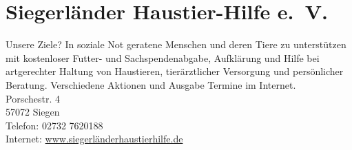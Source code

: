 \section{Siegerländer Haustier-Hilfe e.~V.}
Unsere Ziele? In soziale Not geratene Menschen und deren Tiere zu unterstützen mit kostenloser Futter- und Sachspendenabgabe, Aufklärung und Hilfe bei artgerechter Haltung von Haustieren, tierärztlicher Versorgung und persönlicher Beratung. Verschiedene Aktionen und Ausgabe Termine im Internet.\\

Porschestr. 4\\
57072 Siegen\\  
Telefon: 02732 7620188 \\ 
Internet: \href{www.siegerländerhaustierhilfe.de}{www.siegerländerhaustierhilfe.de}
